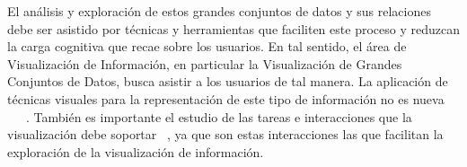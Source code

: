 El análisis y exploración de estos grandes conjuntos de datos y sus relaciones debe ser asistido por técnicas y herramientas que faciliten este proceso y reduzcan la carga cognitiva que recae sobre los usuarios. En tal sentido, el área de Visualización de Información, en particular la Visualización de Grandes Conjuntos de Datos, busca asistir a los usuarios de tal manera. La aplicación de técnicas visuales para la representación de este tipo de información no es nueva ~\cite{xu2005criminal}~\cite{feng2019big}~\cite{mathew2021criminal}. También es importante el estudio de las tareas e interacciones que la visualización debe soportar ~\cite{chen2005visualization}, ya que son estas interacciones las que facilitan la exploración de la visualización de información.
